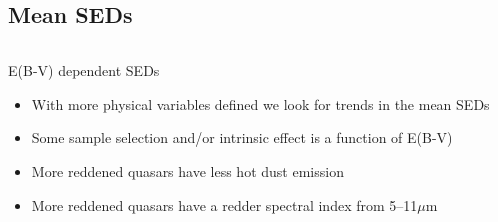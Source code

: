 \documentclass[landscape,9pt]{beamer}
\begin{document}
\subsection{Mean SEDs}
\begin{frame}
	\begin{columns}
		\begin{column}{.35\textwidth}
			\begin{block}{E(B-V) dependent SEDs}
			\begin{itemize}
				\item<1-> With more physical variables defined we look for trends in the mean SEDs
				\item<1-> Some sample selection and/or intrinsic effect is a function of E(B-V)
				\item<2> More reddened quasars have less hot dust emission
				\item<3> More reddened quasars have a redder spectral index from 5--11$\mu$m
			\end{itemize}
			\end{block}
		\end{column}
		\begin{column}{.75\textwidth}
\end{column}
\end{columns}
\end{frame}
\end{document}
